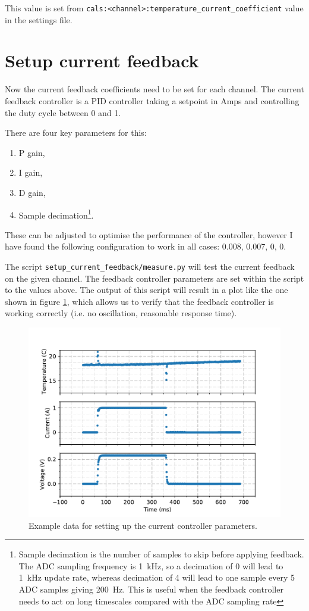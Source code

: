 \documentclass{article}
\begin{document}
This value is set from \texttt{cals:<channel>:temperature\_current\_coefficient} value in the settings file.

\clearpage
\section{Setup current feedback}

Now the current feedback coefficients need to be set for each channel.
The current feedback controller is a PID controller taking a setpoint in Amps and controlling the duty cycle between 0 and 1.

There are four key parameters for this:
\begin{enumerate}
\item P gain,
\item I gain,
\item D gain,
\item Sample decimation\footnote{Sample decimation is the number of samples to skip before applying feedback. The ADC sampling frequency is \SI{1}{kHz}, so a decimation of 0 will lead to \SI{1}{kHz} update rate, whereas decimation of 4 will lead to one sample every 5 ADC samples giving \SI{200}{Hz}. This is useful when the feedback controller needs to act on long timescales compared with the ADC sampling rate}.
\end{enumerate}
These can be adjusted to optimise the performance of the controller, however I have found the following configuration to work in all cases:
0.008, 0.007, 0, 0.

The script \texttt{setup\_current\_feedback/measure.py} will test the current feedback on the given channel.
The feedback controller parameters are set within the script to the values above.
The output of this script will result in a plot like the one shown in figure \ref{fig:current_feedback}, which allows us to verify that the feedback controller is working correctly (i.e. no oscillation, reasonable response time).

\begin{figure}
    \center
    \includegraphics[scale=1]{figures/current_feedback_risetime_data_1.pdf}
    \caption{Example data for setting up the current controller parameters.}
    \label{fig:current_feedback}
\end{figure}
\end{document}

